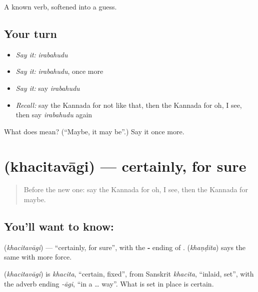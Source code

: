 \begin{grammarlens}[title={What you've built}]
A known verb, softened into a guess.
\end{grammarlens}

\subsection*{Your turn}
\begin{itemize}
\raggedright
  \item \emph{Say it:} \emph{irabahudu}
  \item \emph{Say it:} \emph{irabahudu}, once more
  \item \emph{Say it:} say \emph{irabahudu}
  \item \emph{Recall:} say the Kannada for not like that, then the Kannada for oh, I see, then say \emph{irabahudu} again
\end{itemize}

\begin{tcolorbox}[breakable,colback=teal!4,colframe=teal!35!black,title={Before you move on}]
What does  mean? (\textquotedblleft{}Maybe, it may be\textquotedblright{}.) Say it once more.
\end{tcolorbox}
\section[\texorpdfstring{\kn{ಖಚಿತವಾಗಿ} (khacitavāgi)}{ಖಚಿತವಾಗಿ (khacitavāgi)}]{ (khacitavāgi) — certainly, for sure}

\label{lesson:KA-C95-certainly}



\begin{quote}
Before the new one: say the Kannada for oh, I see, then the Kannada for maybe.
\end{quote}

\subsection*{You'll want to know: }
\textbf{} (\emph{khacitavāgi}) — \textquotedblleft{}certainly, for sure\textquotedblright{}, with the \textbf{‑} ending of \textbf{}. \textbf{} (\emph{khaṇḍita}) says the same with more force.

\begin{cousinweb}
\textbf{} (\emph{khacitavāgi}) is \emph{khacita}, \textquotedblleft{}certain, fixed\textquotedblright{}, from Sanskrit \emph{khacita}, \textquotedblleft{}inlaid, set\textquotedblright{}, with the adverb ending \emph{-āgi}, \textquotedblleft{}in a … way\textquotedblright{}. What is set in place is certain.
\end{cousinweb}

